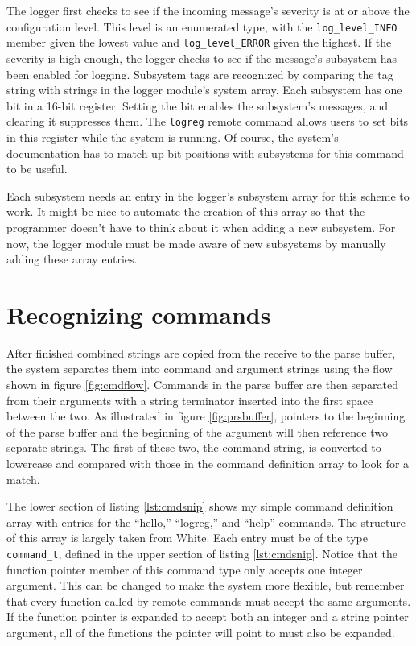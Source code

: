 The logger first checks to see if the incoming message's severity is at or above the configuration level.  This level is an enumerated type, with the \texttt{log\_level\_INFO} member given the lowest value and \texttt{log\_level\_ERROR} given the highest.  If the severity is high enough, the logger checks to see if the message's subsystem has been enabled for logging.  Subsystem tags are recognized by comparing the tag string with strings in the logger module's system array.  Each subsystem has one bit in a 16-bit register.  Setting the bit enables the subsystem's messages, and clearing it suppresses them.  The \texttt{logreg} remote command allows users to set bits in this register while the system is running.  Of course, the system's documentation has to match up bit positions with subsystems for this command to be useful. 

Each subsystem needs an entry in the logger's subsystem array for this scheme to work.  It might be nice to automate the creation of this array so that the programmer doesn't have to think about it when adding a new subsystem.  For now, the logger module must be made aware of new subsystems by manually adding these array entries.
      

\clearpage{}
\section{Recognizing commands}
After finished combined strings are copied from the receive to the parse buffer, the system separates them into command and argument strings using the flow shown in figure \ref{fig:cmdflow}.  Commands in the parse buffer are then separated from their arguments with a string terminator inserted into the first space between the two.  As illustrated in figure \ref{fig:prsbuffer}, pointers to the beginning of the parse buffer and the beginning of the argument will then reference two separate strings.  The first of these two, the command string, is converted to lowercase and compared with those in the command definition array to look for a match.

The lower section of listing \ref{lst:cmdsnip} shows my simple command definition array with entries for the ``hello,'' ``logreg,'' and ``help'' commands. The structure of this array is largely taken from White\cite{bok:white2012}.  Each entry must be of the type \texttt{command\_t}, defined in the upper section of listing \ref{lst:cmdsnip}.  Notice that the function pointer member of this command type only accepts one integer argument.  This can be changed to make the system more flexible, but remember that every function called by remote commands must accept the same arguments.  If the function pointer is expanded to accept both an integer and a string pointer argument, all of the functions the pointer will point to must also be expanded.  

